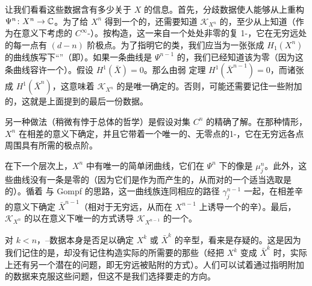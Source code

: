 让我们看看这些数据含有多少关于 $X$ 的信息。首先，分歧数据使人能够从\trTopology{}上重构 $\Psi^n\colon X^n\to\mathbb{C}$。为了给 $X^n$ 得到一个\trWellDefined{}的\trFukayaCategory，还需要知道 $\mathcal{K}_{X^n}$ 的\trTrivialization，至少从\trTopology{}上知道（作为在\trHomotopy{}意义下考虑的 $C^{\infty}$-\trTrivialization）。按构造，这一\trTrivialization{}来自一个处处非零的复 1-\trForm，它在无穷远处的每一点有 $(d-n)$ 阶极点。为了指明它的\trHomotopy{}类，我们应当为一张张成 $H_1(X^n)$ 的\trImmersion{}曲线族写下“\trRotationNumber{}”（即\trMaslovIndex）。如果一条曲线是 $\Psi^{n-1}$ 的\trVanishingCycle，我们已经知道该\trRotationNumber{}为零（因为这条曲线容许一个\trGrading）。假设 $H^1(\bar{X})=0$。那么由弱 \trLefschetz{}定理 $H^1(\bar{X}^{n-1})=0$，而诸\trVanishingCycle{}张成 $H^1(\bar{X}^n)$，这意味着 $\mathcal{K}_{X^n}$ 的\trTrivialization{}是唯一确定的。否则，可能还需要记住一些附加的\trRotationNumber，这就是上面提到的最后一份数据。
\begin{remark}\label{thm:branch-point-alternative}
另一种做法（稍微有悖于总体的哲学）是假设对\trBranchPoint{}集 $C^n$ 的精确了解。在那种情形，$X^n$ 在相差\trHolomorphic{}\trIsomorphism{}的意义下确定，并且它带着一个唯一的、无零点的\trHolomorphic{}1-\trForm，它在无穷远各点周围具有所需的极点阶。
\end{remark}
在下一个层次上，$X^n$ 中有唯一的简单闭曲线，它们在 $\Psi^n$ 下的像是 $\mu^n_j$。此外，这些曲线没有一条是零\trHomology{}的（因为它们是作为\trVanishingCycle{}而产生的，从而对\trForm{}的一个适当选取是\trExact{}的）。循着 \trDonaldson{}与 Gompf 的思路，这一曲线族连同相应的路径 $\gamma^{n-1}_j$ 一起，在相差辛\trIsomorphism{}的意义下确定 $\bar{X}^{n-1}$（相对于无穷远\trDivisor，从而在 $X^{n-1}$ 上诱导一个\trExact{}的辛\trIsomorphism）。最后，$\mathcal{K}_{X^n}$ 的\trTrivialization{}以在\trHomotopy{}意义下唯一的方式诱导 $\mathcal{K}_{X^{n-1}}$ 的一个。

对 $k<n$，\trPicard--\trLefschetz{}数据本身是否足以确定 $X^k$ 或 $\bar{X}^k$ 的辛\trIsomorphism{}型，看来是存疑的。这是因为我们记住的是\trMatchingPath，却没有记住构造实际的\trMatchingCycle{}所需要的那些\trIsotopy（经\trCompactification{}把 $X^k$ 变成 $\bar{X}^k$ 时，实际上还有另一个潜在的问题，即无穷远\trDivisor{}被贴附的方式）。人们可以试着通过指明附加的数据来克服这些问题，但这不是我们选择要走的方向。
